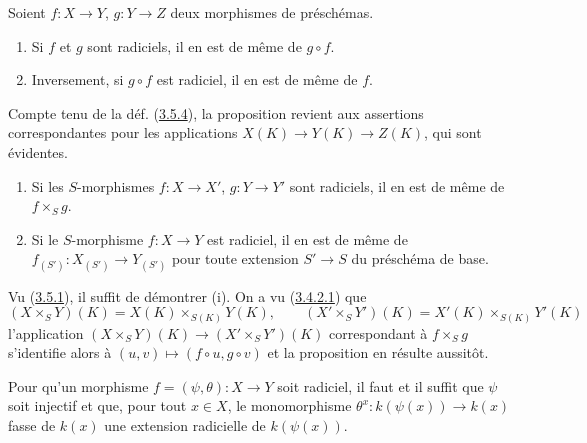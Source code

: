 \begin{proposition}[3.5.6]
\label{I.3.5.6-fr}
Soient $f:X\to Y$, $g:Y\to Z$ deux morphismes de préschémas.
\begin{enumerate}
  \item[(i)] Si $f$ et $g$ sont radiciels, il en est de même de $g\circ f$.
  \item[(ii)] Inversement, si $g\circ f$ est radiciel, il en est de même de
  $f$.
\end{enumerate}
\end{proposition}

Compte tenu de la déf. (\hyperref[I.3.5.4-fr]{3.5.4}), la proposition revient
aux assertions correspondantes pour les applications
$X(K)\to Y(K)\to Z(K)$, qui sont évidentes.

\begin{proposition}[3.5.7]
\label{I.3.5.7-fr}
\begin{enumerate}
  \item[(i)] Si les $S$-morphismes $f:X\to X'$, $g:Y\to Y'$ sont radiciels,
  il en est de même de $f\times_S g$.
  \item[(ii)] Si le $S$-morphisme $f:X\to Y$ est radiciel, il en est de même
  de $f_{(S')}:X_{(S')}\to Y_{(S')}$ pour toute extension $S'\to S$ du
  préschéma de base.
\end{enumerate}
\end{proposition}

Vu (\hyperref[I.3.5.1-fr]{3.5.1}), il suffit de démontrer (i). On a vu
(\hyperref[I.3.4.2.1-fr]{3.4.2.1}) que
\label{I.3.5.7.field-valued-product-fr}
\[
  (X\times_S Y)(K)=X(K)\times_{S(K)}Y(K),\qquad
  (X'\times_S Y')(K)=X'(K)\times_{S(K)}Y'(K)
\]
l'application $(X\times_S Y)(K)\to(X'\times_S Y')(K)$ correspondant à
$f\times_S g$ s'identifie alors à $(u,v)\mapsto(f\circ u,g\circ v)$ et la
proposition en résulte aussitôt.

\begin{proposition}[3.5.8]
\label{I.3.5.8-fr}
Pour qu'un morphisme $f=(\psi,\theta):X\to Y$ soit radiciel, il faut et il
suffit que $\psi$ soit injectif et que, pour tout $x\in X$, le monomorphisme
$\theta^x:k(\psi(x))\to k(x)$ fasse de $k(x)$ une extension radicielle de
$k(\psi(x))$.
\end{proposition}

